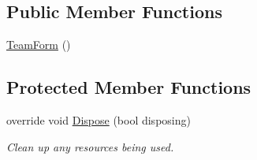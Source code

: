 \subsection*{Public Member Functions}
\begin{DoxyCompactItemize}
\item 
\hyperlink{classPCO_1_1__0_1_1TeamForm_a0db8eadd490077e3330e0254ccdc1cee}{Team\+Form} ()
\end{DoxyCompactItemize}
\subsection*{Protected Member Functions}
\begin{DoxyCompactItemize}
\item 
override void \hyperlink{classPCO_1_1__0_1_1TeamForm_a5449a007da7a31beca89946d925d0b69}{Dispose} (bool disposing)
\begin{DoxyCompactList}\small\item\em Clean up any resources being used. \end{DoxyCompactList}\end{DoxyCompactItemize}
